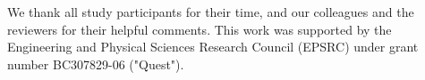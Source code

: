 \documentclass[manuscript,screen,review]{acmart}
\begin{document}
\begin{acks}
We thank all study participants for their time, and our colleagues and the reviewers for their helpful comments.
This work was supported by the Engineering and Physical Sciences Research Council (EPSRC) under grant number BC307829-06 ("Quest").
\end{acks}




\appendix
\end{document}
